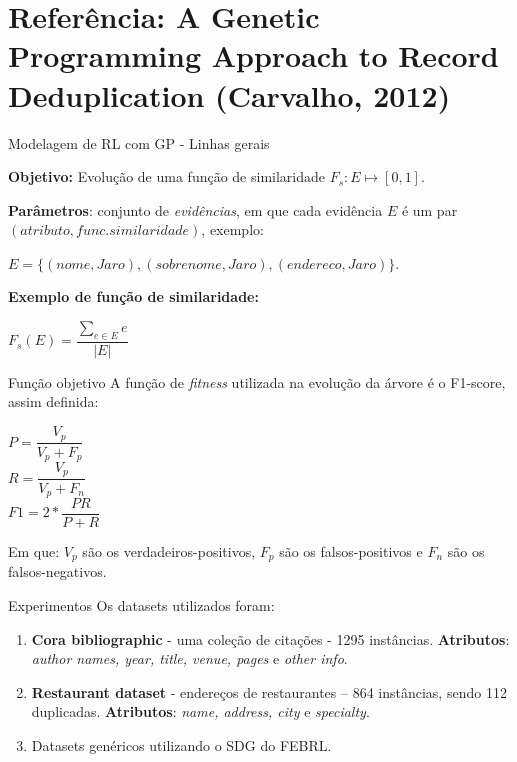 \documentclass{beamer}
\begin{document}
  \section{Referência: A Genetic Programming Approach to Record Deduplication (Carvalho, 2012)}

  \begin{frame}{Modelagem de RL com GP - Linhas gerais}

      \textbf{Objetivo:} Evolução de uma função de similaridade $F_s: E \mapsto [0,1]$.

      \textbf{Parâmetros}: conjunto de \textit{evidências}, em que cada evidência $E$ é um par $(atributo, func. similaridade)$, exemplo:
      \begin{center}
      $E = \{(nome, Jaro), (sobrenome, Jaro), (endereco, Jaro)\}$.
      \end{center}

      \textbf{Exemplo de função de similaridade:}
      \begin{center}
          $F_s(E) = \dfrac{\sum \limits_{e \in E} e}{|E|}$
      \end{center}
  \end{frame}

  \begin{frame}{Função objetivo}
      A função de \textit{fitness} utilizada na evolução da árvore é o F1-score, assim definida:

      \begin{center}
          $P = \dfrac{V_p}{V_p+F_p}$ \\
          $R = \dfrac{V_p}{V_p+F_n}$ \\
          $F1 = 2*\dfrac{PR}{P+R}$ \\
      \end{center}
      Em que: $V_p$ são os verdadeiros-positivos, $F_p$ são os falsos-positivos e $F_n$ são os falsos-negativos.
  \end{frame}

  \begin{frame}{Experimentos}
      Os datasets utilizados foram:
      \begin{enumerate}
          \item \textbf{Cora bibliographic} - uma coleção de citações - 1295 instâncias. \textbf{Atributos}: \textit{author names, year, title, venue, pages} e \textit{other info}.
          \item \textbf{Restaurant dataset} - endereços de restaurantes -- 864 instâncias, sendo 112 duplicadas. \textbf{Atributos}: \textit{name, address, city} e \textit{specialty}.
          \item Datasets genéricos utilizando o SDG do FEBRL.
      \end{enumerate}
  \end{frame}
\end{document}
